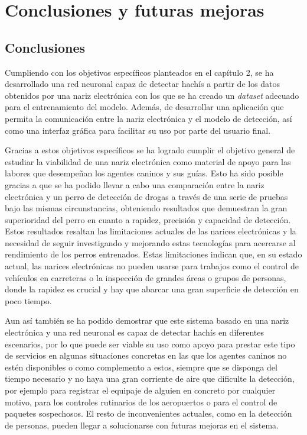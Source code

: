 \chapter{Conclusiones y futuras mejoras}
\section{Conclusiones}
Cumpliendo con los objetivos específicos planteados en el capítulo 2, se ha desarrollado una red neuronal capaz de detectar hachís a partir de los datos obtenidos por una nariz electrónica con los que se ha creado un \textit{dataset} adecuado para el entrenamiento del modelo. Además, de desarrollar una aplicación que permita la comunicación entre la nariz electrónica y el modelo de detección, así como una interfaz gráfica para facilitar su uso por parte del usuario final.
\par

Gracias a estos objetivos específicos se ha logrado cumplir el objetivo general de estudiar la viabilidad de una nariz electrónica como material de apoyo para las labores que desempeñan los agentes caninos y sus guías. Esto ha sido posible gracias a que se ha podido llevar a cabo una comparación entre la nariz electrónica y un perro de detección de drogas a través de una serie de pruebas bajo las mismas circunstancias, obteniendo resultados que demuestran la gran superioridad del perro en cuanto a rapidez, precisión y capacidad de detección. Estos resultados resaltan las limitaciones actuales de las narices electrónicas y la necesidad de seguir investigando y mejorando estas tecnologías para acercarse al rendimiento de los perros entrenados. Estas limitaciones indican que, en su estado actual, las narices electrónicas no pueden usarse para trabajos como el control de vehículos en carreteras o la inspección de grandes áreas o grupos de personas, donde la rapidez es crucial y hay que abarcar una gran superficie de detección en poco tiempo.
\par

Aun así también se ha podido demostrar que este sistema basado en una nariz electrónica y una red neuronal es capaz de detectar hachís en diferentes escenarios, por lo que puede ser viable su uso como apoyo para prestar este tipo de servicios en algunas situaciones concretas en las que los agentes caninos no estén disponibles o como complemento a estos, siempre que se disponga del tiempo necesario y no haya una gran corriente de aire que dificulte la detección, por ejemplo para registrar el equipaje de alguien en concreto por cualquier motivo, para los controles rutinarios de los aeropuertos o para el control de paquetes sospechosos. El resto de inconvenientes actuales, como en la detección de personas, pueden llegar a solucionarse con futuras mejoras en el sistema.
\par

